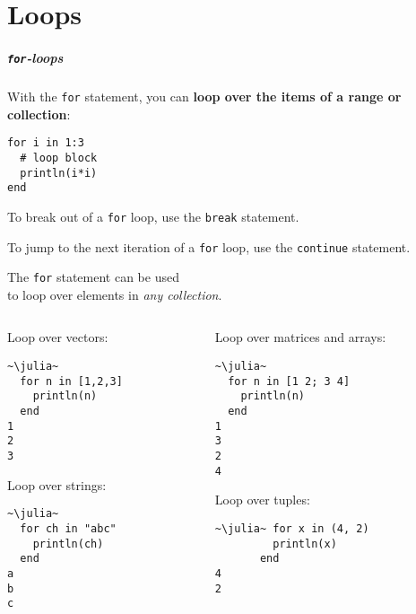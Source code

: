 \documentclass[english,serif,mathserif,xcolor=pdftex,dvipsnames,table]{beamer}
\begin{document}
\part{Loops}
\begin{frame}[fragile]
  \frametitle{\texttt{for}-loops}
    With the  \texttt{for} statement, you can \textbf{loop over the items of
    a range or collection}:
\begin{lstlisting}
for i in 1:3
  # loop block
  println(i*i)
end
\end{lstlisting}

  \+
  To break out of a \texttt{for} loop, use the \texttt{break}
  statement.

  \+
  To jump to the next iteration of a \texttt{for} loop, use the
  \texttt{continue} statement.
\end{frame}


\begin{frame}[fragile]
  The \texttt{for} statement can be used \\ to loop over elements in \emph{any collection}.

  \+
  \begin{columns}[c]
    \smaller
    \begin{column}{0.5\textwidth}
      \raggedright

      Loop over vectors:
      \vspace{-1ex}
\begin{lstlisting}
~\julia~
  for n in [1,2,3]
    println(n)
  end
1
2
3
\end{lstlisting}

      \+ Loop over strings:
      \vspace{-1ex}
\begin{lstlisting}
~\julia~
  for ch in "abc"
    println(ch)
  end
a
b
c
\end{lstlisting}
    \end{column}
    \begin{column}{0.5\textwidth}
      \raggedright

      Loop over matrices and arrays:
      \vspace{-1ex}
\begin{lstlisting}
~\julia~
  for n in [1 2; 3 4]
    println(n)
  end
1
3
2
4
\end{lstlisting}

      \+ Loop over tuples:
      \vspace{-1ex}
\begin{lstlisting}
~\julia~ for x in (4, 2)
         println(x)
       end
4
2
\end{lstlisting}

    \end{column}
  \end{columns}
\end{frame}
\end{document}
